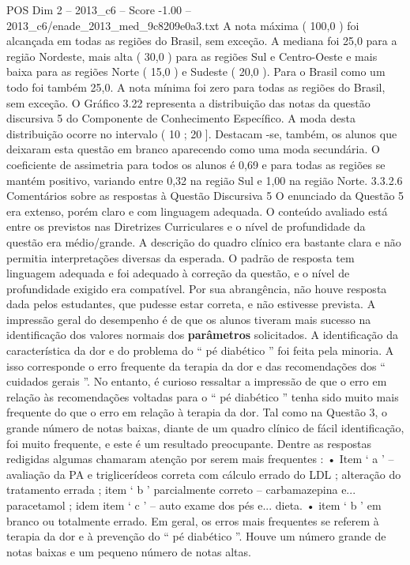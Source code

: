 \begin{textsample}{POS Dim 2 – 2013\_c6 – Score -1.00 – 2013\_c6/enade\_2013\_med\_9c8209e0a3.txt}
A nota máxima ( 100,0 ) foi alcançada em todas as regiões do Brasil, sem exceção.
A mediana foi 25,0 para a região Nordeste, mais alta ( 30,0 ) para as regiões Sul e Centro-Oeste e mais baixa para as regiões Norte ( 15,0 ) e Sudeste ( 20,0 ).
Para o Brasil como um todo foi também 25,0.
A nota mínima foi zero para todas as regiões do Brasil, sem exceção.
O Gráfico 3.22 representa a distribuição das notas da questão discursiva 5 do Componente de Conhecimento Específico.
A moda desta distribuição ocorre no intervalo ( 10 ; 20 ].
Destacam -se, também, os alunos que deixaram esta questão em branco aparecendo como uma moda secundária.
O coeficiente de assimetria para todos os alunos é 0,69 e para todas as regiões se mantém positivo, variando entre 0,32 na região Sul e 1,00 na região Norte. 3.3.2.6 Comentários sobre as respostas à Questão Discursiva 5 O enunciado da Questão 5 era extenso, porém claro e com linguagem adequada.
O conteúdo avaliado está entre os previstos nas Diretrizes Curriculares e o nível de profundidade da questão era médio/grande.
A descrição do quadro clínico era bastante clara e não permitia interpretações diversas da esperada.
O padrão de resposta tem linguagem adequada e foi adequado à correção da questão, e o nível de profundidade exigido era compatível.
Por sua abrangência, não houve resposta dada pelos estudantes, que pudesse estar correta, e não estivesse prevista.
A impressão geral do desempenho é de que os alunos tiveram mais sucesso na identificação dos valores normais dos \textbf{parâmetros} solicitados.
A identificação da característica da dor e do problema do “ pé diabético ” foi feita pela minoria.
A isso corresponde o erro frequente da terapia da dor e das recomendações dos “ cuidados gerais ”.
No entanto, é curioso ressaltar a impressão de que o erro em relação às recomendações voltadas para o “ pé diabético ” tenha sido muito mais frequente do que o erro em relação à terapia da dor.
Tal como na Questão 3, o grande número de notas baixas, diante de um quadro clínico de fácil identificação, foi muito frequente, e este é um resultado preocupante.
Dentre as respostas redigidas algumas chamaram atenção por serem mais frequentes : • Item ‘ a ’ – avaliação da PA e triglicerídeos correta com cálculo errado do LDL ; alteração do tratamento errada ; item ‘ b ’ parcialmente correto – carbamazepina e... paracetamol ; idem item ‘ c ’ – auto exame dos pés e... dieta. • item ‘ b ’ em branco ou totalmente errado.
Em geral, os erros mais frequentes se referem à terapia da dor e à prevenção do “ pé diabético ”.
Houve um número grande de notas baixas e um pequeno número de notas altas.

\end{textsample}
